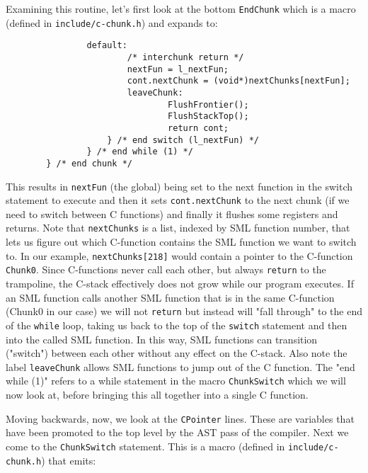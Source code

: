 Examining this routine, let's first look at the bottom \texttt{EndChunk} which is a macro (defined in \texttt{include/c-chunk.h}) and expands to:

\begin{minipage}{\linewidth}
\lstset{language=C}\begin{lstlisting}
                default:
                        /* interchunk return */
                        nextFun = l_nextFun;
                        cont.nextChunk = (void*)nextChunks[nextFun];
                        leaveChunk:
                                FlushFrontier();
                                FlushStackTop();
                                return cont;
                    } /* end switch (l_nextFun) */
                } /* end while (1) */
        } /* end chunk */	
\end{lstlisting}
\end{minipage}

This results in \texttt{nextFun} (the global) being set to the next function in the switch statement to execute and then it sets \texttt{cont.nextChunk} to the next chunk (if we need to switch between C functions) and finally it flushes some registers and returns. Note that \texttt{nextChunks} is a list, indexed by SML function number, that lets us figure out which C-function contains the SML function we want to switch to. In our example, \texttt{nextChunks[218]} would contain a pointer to the C-function \texttt{Chunk0}. Since C-functions never call each other, but always \texttt{return} to the trampoline, the C-stack effectively does not grow while our program executes. If an SML function calls another SML function that is in the same C-function (Chunk0 in our case) we will not \texttt{return} but instead will "fall through" to the end of the \texttt{while} loop, taking us back to the top of the \texttt{switch} statement and then into the called SML function. In this way, SML functions can transition ("switch") between each other without any effect on the C-stack. Also note the label \texttt{leaveChunk} allows SML functions to jump out of the C function. The "end while (1)" refers to a while statement in the macro \texttt{ChunkSwitch} which we will now look at, before bringing this all together into a single C function.

Moving backwards, now, we look at the \texttt{CPointer} lines. These are variables that have been promoted to the top level by the AST pass of the compiler. Next we come to the \texttt{ChunkSwitch} statement. This is a macro (defined in \texttt{include/c-chunk.h}) that emits:

